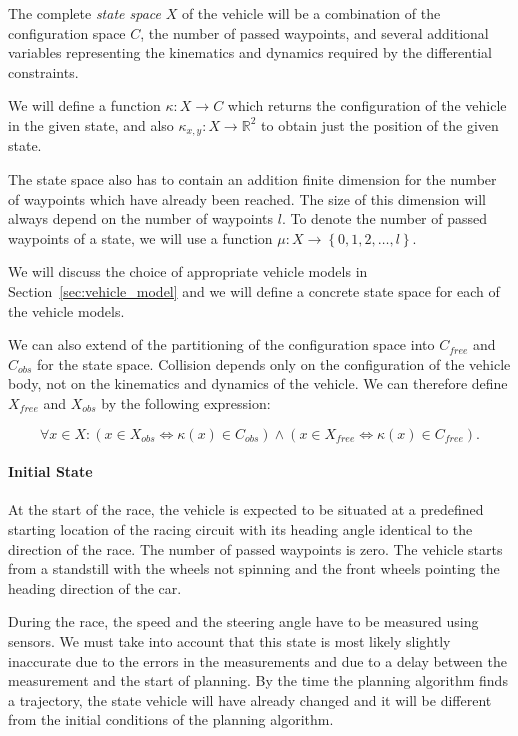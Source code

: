 The complete \textit{state space} $X$ of the vehicle will be a combination of the configuration space $C$, the number of passed waypoints, and several additional variables representing the kinematics and dynamics required by the differential constraints.

We will define a function $\kappa: X\rightarrow C$ which returns the configuration of the vehicle in the given state, and also $\kappa_{x,y}: X\rightarrow \mathbb{R}^2$ to obtain just the position of the given state.

The state space also has to contain an addition finite dimension for the number of waypoints which have already been reached. The size of this dimension will always depend on the number of waypoints $l$. To denote the number of passed waypoints of a state, we will use a function $\mu: X \rightarrow \left\{0, 1, 2,\dots, l\right\}$.

We will discuss the choice of appropriate vehicle models in Section~\ref{sec:vehicle_model} and we will define a concrete state space for each of the vehicle models.

We can also extend of the partitioning of the configuration space into $C_{free}$ and $C_{obs}$ for the state space. Collision depends only on the configuration of the vehicle body, not on the kinematics and dynamics of the vehicle. We can therefore define $X_{free}$ and $X_{obs}$ by the following expression:

\begin{equation*}
\forall x\in X: \left(x\in X_{obs} \iff \kappa(x)\in C_{obs}\right) \wedge \left(x\in X_{free} \iff \kappa(x)\in C_{free}\right).
\end{equation*}

\paragraph{Initial State}
At the start of the race, the vehicle is expected to be situated at a predefined starting location of the racing circuit with its heading angle identical to the direction of the race. The number of passed waypoints is zero. The vehicle starts from a standstill with the wheels not spinning and the front wheels pointing the heading direction of the car.

During the race, the speed and the steering angle have to be measured using sensors. We must take into account that this state is most likely slightly inaccurate due to the errors in the measurements and due to a delay between the measurement and the start of planning. By the time the planning algorithm finds a trajectory, the state vehicle will have already changed and it will be different from the initial conditions of the planning algorithm.


